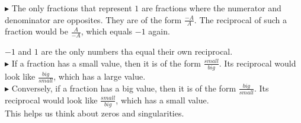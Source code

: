 \documentclass{ximera}
\begin{document}
$\blacktriangleright$ The only fractions that represent $1$ are fractions where the numerator and denominator are opposites.  They are of the form $\frac{-A}{A}$.  The reciprocal of such a fraction would be $\frac{A}{-A}$, which equals $-1$ again.



$-1$ and $1$ are the only numbers tha equal their own reciprocal. \\





$\blacktriangleright$ If a fraction has a small value, then it is of the form $\frac{small}{big}$.  Its reciprocal would look like $\frac{big}{small}$, which has a large value. \\



$\blacktriangleright$ Conversely, if a fraction has a big value, then it is of the form $\frac{big}{small}$.  Its reciprocal would look like $\frac{small}{big}$, which has a small value. \\




This helps us think about zeros and singularities.
\end{document}
